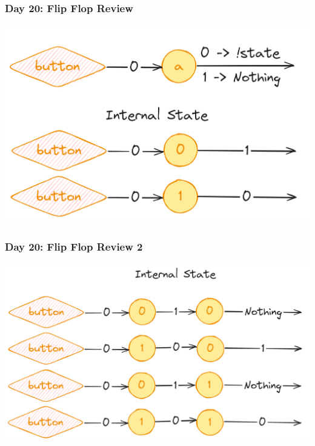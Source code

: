 \begin{frame}
\frametitle{Day 20: Flip Flop Review}

\includegraphics[width=\textwidth]{Day20FlipFlop1Bit}

\end{frame}

\begin{frame}
\frametitle{Day 20: Flip Flop Review 2}

\includegraphics[width=\textwidth]{Day20FlipFlop2Bit}

\end{frame}


